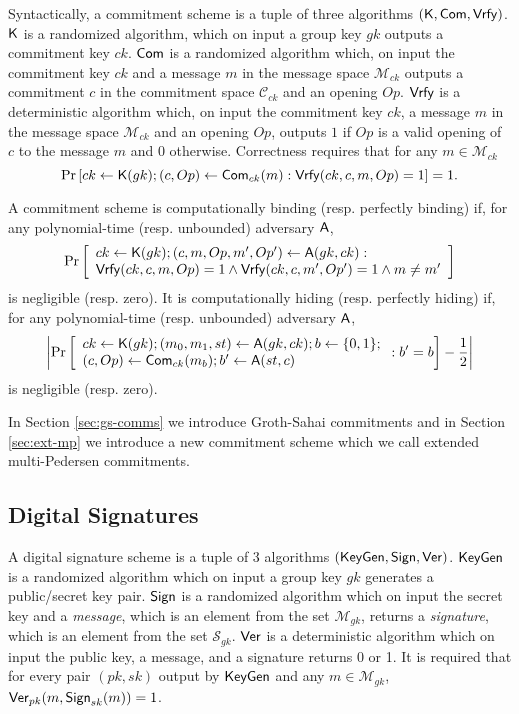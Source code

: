 Syntactically, a commitment scheme is a tuple of three algorithms $(\mathsf{K},\mathsf{Com},\mathsf{Vrfy})$. $\mathsf{K}$ is a randomized algorithm, which on input a group key $gk$ outputs a commitment key $ck$. $\mathsf{Com}$ is a randomized algorithm which, on input the commitment key $ck$ and a message $m$ in the message space $\mathcal{M}_{ck}$ outputs a commitment $c$ in the commitment space $\mathcal{C}_{ck}$ and an opening $Op$. $\mathsf{Vrfy}$ is a deterministic algorithm which, on input the commitment key $ck$, a message $m$ in the message space $\mathcal{M}_{ck}$ and an opening $Op$, outputs $1$ if $Op$ is a valid opening of $c$ to the message $m$ and $0$ otherwise. 
Correctness requires that for any $m \in \mathcal{M}_{ck}$
$$\Pr\left[ck \gets \mathsf{K}(gk); 
(c, Op) \gets \mathsf{Com}_{ck}(m): \mathsf{Vrfy}(ck,c,m,Op)=1 \right]=1.$$

\begin{definition}  A commitment scheme is computationally binding (resp. perfectly binding) if, for any polynomial-time (resp. unbounded)  adversary $\mathsf{A}$, 
	$$\Pr\left[\begin{array}{l} ck \gets \mathsf{K}(gk); (c,m,Op,m',Op') \gets \mathsf{A}(gk,ck):\\ \mathsf{Vrfy}(ck,c,m,Op)=1 \wedge \mathsf{Vrfy}(ck,c,m',Op')=1 \wedge m\neq m'\end{array}\right] $$
	is negligible (resp. zero).  It is computationally hiding (resp. perfectly hiding)  if, for any polynomial-time (resp. unbounded) adversary $\mathsf{A}$,
	$$\left|\Pr\left[ \begin{array}{l} ck \gets \mathsf{K}(gk); (m_0,m_1,st) \gets \mathsf{A}(gk,ck); b \gets \{0,1\};\\ (c,Op) \gets \mathsf{Com}_{ck}(m_b); b' \gets \mathsf{A}(st,c)
                      \end{array} : b'=b\right] -\dfrac{1}{2} \right|$$
	is negligible (resp. zero).
\end{definition}

In Section \ref{sec:gs-comms} we introduce Groth-Sahai commitments and in Section \ref{sec:ext-mp} we introduce a new commitment scheme which we call extended multi-Pedersen commitments.

\subsection{Digital Signatures} \label{sec:uf-cma} \label{sec:ots}

A digital signature scheme is a tuple of 3 algorithms $(\mathsf{KeyGen},\mathsf{Sign},\mathsf{Ver})$. $\mathsf{KeyGen}$ is a randomized algorithm which on input a group key $gk$ generates a public/secret key pair. $\mathsf{Sign}$ is a randomized algorithm which on input the secret key and a \emph{message}, which is an element from the set $\mathcal{M}_{gk}$, returns a \emph{signature}, which is an element from the set $\mathcal{S}_{gk}$. $\mathsf{Ver}$ is a deterministic algorithm which on input the public key, a message, and a signature returns 0 or 1. It is required that for every pair $(pk,sk)$ output by $\mathsf{KeyGen}$ and any $m\in\mathcal{M}_{gk}$, $\mathsf{Ver}_{pk}(m,\mathsf{Sign}_{sk}(m))=1$.

